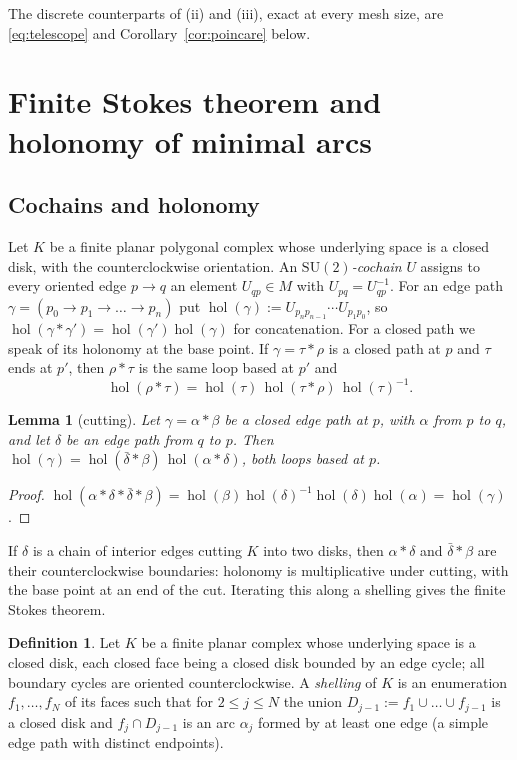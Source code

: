 \documentclass[11pt,reqno]{amsart}
\newtheorem{lemma}[theorem]{Lemma}
\theoremstyle{definition}
\newtheorem{definition}[theorem]{Definition}
\theoremstyle{remark}
\numberwithin{equation}{section}
\newcommand{\SU}{\mathrm{SU}}
\newcommand{\hol}{\operatorname{hol}}
\begin{document}
The discrete counterparts of (ii) and (iii), exact at every mesh size, are \eqref{eq:telescope} and
Corollary~\ref{cor:poincare} below.

\section{Finite Stokes theorem and holonomy of minimal arcs}\label{sec:stokes}

\subsection{Cochains and holonomy}
Let $K$ be a finite planar polygonal complex whose underlying space is a closed disk, with the
counterclockwise orientation.  An \emph{$\SU(2)$-cochain} $U$ assigns to every oriented edge $p\to q$ an
element $U_{qp}\in M$ with $U_{pq}=U_{qp}^{-1}$.  For an edge path $\gamma=(p_0\to p_1\to\dots\to p_n)$ put
$\hol(\gamma):=U_{p_np_{n-1}}\cdots U_{p_1p_0}$, so $\hol(\gamma*\gamma')=\hol(\gamma')\hol(\gamma)$ for
concatenation.  For a closed path we speak of its holonomy at the base point.  If $\gamma=\tau*\rho$ is a closed
path at $p$ and $\tau$ ends at $p'$, then $\rho*\tau$ is the same loop based at $p'$ and
\begin{equation}\label{eq:rebase}
\hol(\rho*\tau)=\hol(\tau)\,\hol(\tau*\rho)\,\hol(\tau)^{-1}.
\end{equation}

\begin{lemma}[cutting]\label{lem:cut}
Let $\gamma=\alpha*\beta$ be a closed edge path at $p$, with $\alpha$ from $p$ to $q$, and let $\delta$ be an edge
path from $q$ to $p$.  Then $\hol(\gamma)=\hol(\bar\delta*\beta)\,\hol(\alpha*\delta)$, both loops based at $p$.
\end{lemma}
\begin{proof}
$\hol(\alpha*\delta*\bar\delta*\beta)=\hol(\beta)\hol(\delta)^{-1}\hol(\delta)\hol(\alpha)=\hol(\gamma)$.
\end{proof}

If $\delta$ is a chain of interior edges cutting $K$ into two disks, then $\alpha*\delta$ and $\bar\delta*\beta$ are
their counterclockwise boundaries: holonomy is multiplicative under cutting, with the base point at an end
of the cut.  Iterating this along a shelling gives the finite Stokes theorem.

\begin{definition}
Let $K$ be a finite planar complex whose underlying space is a closed disk, each closed face being a closed disk
bounded by an edge cycle; all boundary cycles are oriented counterclockwise.  A \emph{shelling} of $K$ is an
enumeration $f_1,\dots,f_N$ of its faces such that for $2\le j\le N$ the union $D_{j-1}:=f_1\cup\dots\cup f_{j-1}$ is a
closed disk and $f_j\cap D_{j-1}$ is an arc $\alpha_j$ formed by at least one edge (a simple edge path with distinct
endpoints).
\end{definition}
\end{document}
